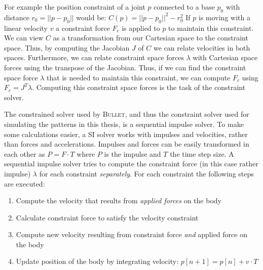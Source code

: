 \documentclass[english,ngerman]{KITreprt}
\newcommand{\name}[1]{\textsc{#1}}
\begin{document}
For example the position constraint of a joint $p$ connected to a base
$p_0$ with distance $r_0 = ||p-p_0||$ would be:
$C(p) = || p - p_0 ||^2 - r_0^2$ If $p$ is moving with a linear velocity
$v$ a constraint force $F_c$ is applied to $p$ to maintain this
constraint. We can view $C$ as a transformation from our Cartesian space
to the constraint space. Thus, by computing the Jacobian $J$ of $C$ we
can relate velocities in both spaces. Furthermore, we can relate
constraint space forces $\lambda$ with Cartesian space forces using the
transpose of the Jacobian. Thus, if we can find the constraint space
force $\lambda$ that is needed to maintain this constraint, we can
compute $F_c$ using $F_c = J^T \lambda$. Computing this constraint space
forces is the task of the constraint solver.

The constrained solver used by \name{Bullet}, and thus the constraint
solver used for simulating the patterns in this thesis, is a sequential
impulse solver. To make some calculations easier, a SI solver works with
impulses and velocities, rather than forces and accelerations. Impulses
and forces can be easily transformed in each other as $P = F \cdot T$
where $P$ is the impulse and $T$ the time step size. A sequential
impulse solver tries to compute the constraint force (in this case
rather impulse) $\lambda$ for each constraint \emph{separately}. For
each constraint the following steps are executed:

\begin{enumerate}
\def\labelenumi{\arabic{enumi}.}
\itemsep1pt\parskip0pt
\item
  Compute the velocity that results from \emph{applied forces} on the
  body
\item
  Calculate constraint force to satisfy the velocity constraint
\item
  Compute new velocity resulting from constraint force \emph{and}
  applied force on the body
\item
  Update position of the body by integrating velocity:
  $p[n+1] = p[n] + v \cdot T$
\end{enumerate}
\end{document}

